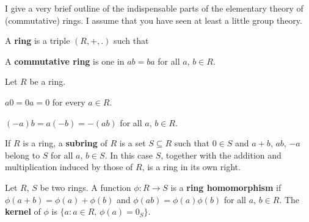 
\def\chaptername{Appendix}
\def\sectionname{Rings}


I give a very brief outline of the indispensable parts of the elementary
theory of (commutative) rings.   I assume that you have seen at least a
little group theory.

 A {\bf ring} is a triple $(R,+,.)$ such that




\noindent A {\bf commutative ring} is one in $ab=ba$ for all $a$, $b\in R$.

 Let $R$ be a ring.

 $a0=0a=0$ for every $a\in R$.   

 $(-a)b=a(-b)=-(ab)$ for all $a$, $b\in R$.

 If $R$ is a ring, a {\bf subring} of $R$ is a
set $S\subseteq R$ such that $0\in S$ and $a+b$, $ab$, $-a$ belong to
$S$ for all $a$, $b\in S$.   In this case $S$, together with the
addition and multiplication induced by those of $R$, is a ring in its
own right.

 Let $R$, $S$ be two rings.   A function
$\phi:R\to S$ is a {\bf ring homomorphism} if
$\phi(a+b)=\phi(a)+\phi(b)$ and $\phi(ab)=\phi(a)\phi(b)$ for all $a$,
$b\in R$.      The {\bf kernel} of $\phi$ is $\{a:a\in
R,\,\phi(a)=0_S\}$.

